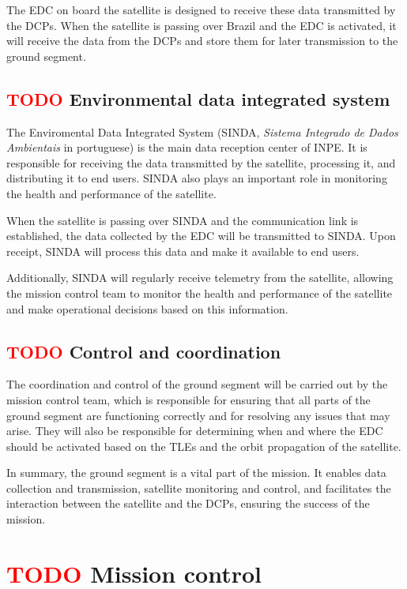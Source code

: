 The EDC on board the satellite is designed to receive these data transmitted by the DCPs. When the satellite is passing over Brazil and the EDC is activated, it will receive the data from the DCPs and store them for later transmission to the ground segment.

\subsection{ \textcolor{red}{TODO} Environmental data integrated system}

The Enviromental Data Integrated System (SINDA, \textit{Sistema Integrado de Dados Ambientais} in portuguese) is the main data reception center of INPE. It is responsible for receiving the data transmitted by the satellite, processing it, and distributing it to end users. SINDA also plays an important role in monitoring the health and performance of the satellite.

When the satellite is passing over SINDA and the communication link is established, the data collected by the EDC will be transmitted to SINDA. Upon receipt, SINDA will process this data and make it available to end users.

Additionally, SINDA will regularly receive telemetry from the satellite, allowing the mission control team to monitor the health and performance of the satellite and make operational decisions based on this information.

\subsection{ \textcolor{red}{TODO} Control and coordination}

The coordination and control of the ground segment will be carried out by the mission control team, which is responsible for ensuring that all parts of the ground segment are functioning correctly and for resolving any issues that may arise. They will also be responsible for determining when and where the EDC should be activated based on the TLEs and the orbit propagation of the satellite.

In summary, the ground segment is a vital part of the mission. It enables data collection and transmission, satellite monitoring and control, and facilitates the interaction between the satellite and the DCPs, ensuring the success of the mission.

\section{ \textcolor{red}{TODO} Mission control}

